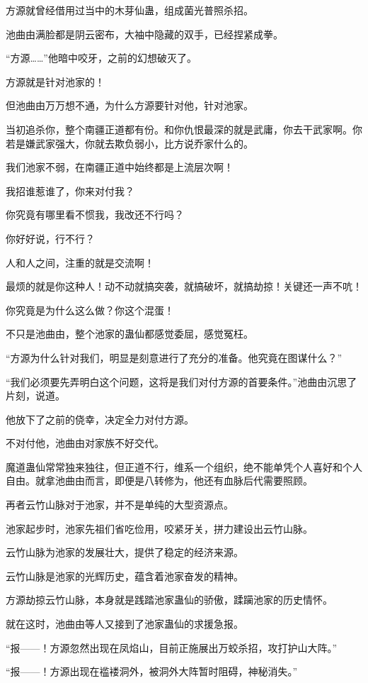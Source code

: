 \begin{this_body}
方源就曾经借用过当中的木芽仙蛊，组成菌光普照杀招。

池曲由满脸都是阴云密布，大袖中隐藏的双手，已经捏紧成拳。

“方源……”他暗中咬牙，之前的幻想破灭了。

方源就是针对池家的！

但池曲由万万想不通，为什么方源要针对他，针对池家。

当初追杀你，整个南疆正道都有份。和你仇恨最深的就是武庸，你去干武家啊。你若是嫌武家强大，你就去欺负弱小，比方说乔家什么的。

我们池家不弱，在南疆正道中始终都是上流层次啊！

我招谁惹谁了，你来对付我？

你究竟有哪里看不惯我，我改还不行吗？

你好好说，行不行？

人和人之间，注重的就是交流啊！

最烦的就是你这种人！动不动就搞突袭，就搞破坏，就搞劫掠！关键还一声不吭！

你究竟是为什么这么做？你这个混蛋！

不只是池曲由，整个池家的蛊仙都感觉委屈，感觉冤枉。

“方源为什么针对我们，明显是刻意进行了充分的准备。他究竟在图谋什么？”

“我们必须要先弄明白这个问题，这将是我们对付方源的首要条件。”池曲由沉思了片刻，说道。

他放下了之前的侥幸，决定全力对付方源。

不对付他，池曲由对家族不好交代。

魔道蛊仙常常独来独往，但正道不行，维系一个组织，绝不能单凭个人喜好和个人自由。就拿池曲由而言，即便是八转修为，他还有血脉后代需要照顾。

再者云竹山脉对于池家，并不是单纯的大型资源点。

池家起步时，池家先祖们省吃俭用，咬紧牙关，拼力建设出云竹山脉。

云竹山脉为池家的发展壮大，提供了稳定的经济来源。

云竹山脉是池家的光辉历史，蕴含着池家奋发的精神。

方源劫掠云竹山脉，本身就是践踏池家蛊仙的骄傲，蹂躏池家的历史情怀。

就在这时，池曲由等人又接到了池家蛊仙的求援急报。

“报——！方源忽然出现在凤焰山，目前正施展出万蛟杀招，攻打护山大阵。”

“报——！方源出现在褴褛洞外，被洞外大阵暂时阻碍，神秘消失。”


\end{this_body}
